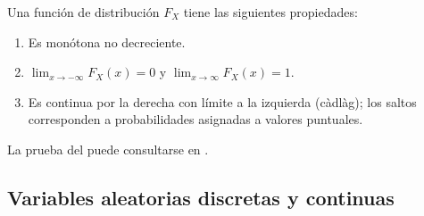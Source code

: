 \documentclass[../Main.tex]{subfiles}
\begin{document}
\begin{lemma}Una función de distribución \(F_X\) tiene las siguientes propiedades:
\begin{enumerate}
    \item Es monótona no decreciente.
    \item \(\displaystyle \lim_{x\to-\infty}F_X(x)=0\) y
          \(\displaystyle \lim_{x\to\infty}F_X(x)=1\).
    \item Es continua por la derecha con límite a la izquierda (càdlàg); los saltos corresponden a
          probabilidades asignadas a valores puntuales.
\end{enumerate}
\label{lemma:dist}
\end{lemma}
La prueba del  puede consultarse en \cite{grimmett2001probability}.

\subsection*{Variables aleatorias discretas y continuas}
\end{document}
